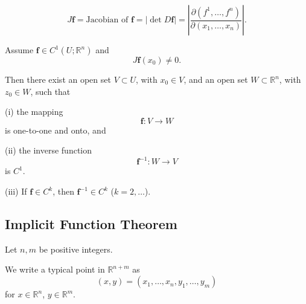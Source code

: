 \begin{definition}
\label{def:jacobian-jf}
$$J\mathbf{f} = \text{Jacobian of } \mathbf{f} = |\det D\mathbf{f}| = \left| \frac{\partial(f^1, \ldots, f^n)}{\partial(x_1, \ldots, x_n)} \right|.$$
\end{definition}

\begin{figure}[h]\centering
\end{figure}

\begin{theorem}
\label{thm:inverse-function-theorem}
Assume $\mathbf{f} \in C^1(U; \mathbb{R}^n)$ and
$$J\mathbf{f}(x_0) \neq 0.$$

Then there exist an open set $V \subset U$, with $x_0 \in V$, and an open set $W \subset \mathbb{R}^n$, with $z_0 \in W$, such that

(i) the mapping
$$\mathbf{f} : V \to W$$
is one-to-one and onto, and

(ii) the inverse function
$$\mathbf{f}^{-1} : W \to V$$
is $C^1$.

(iii) If $\mathbf{f} \in C^k$, then $\mathbf{f}^{-1} \in C^k$ ($k = 2, \ldots$).
\end{theorem}

\begin{figure}[h]\centering
\end{figure}

\subsection{Implicit Function Theorem}

Let $n, m$ be positive integers.

\begin{definition}
\label{def:xy-point-notation-rnm}
We write a typical point in $\mathbb{R}^{n+m}$ as
$$(x, y) = (x_1, \ldots, x_n, y_1, \ldots, y_m)$$
for $x \in \mathbb{R}^n$, $y \in \mathbb{R}^m$.
\end{definition}

